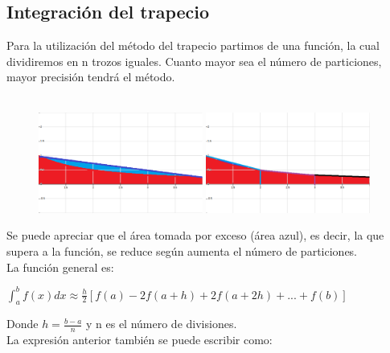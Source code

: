\documentclass{article}
\begin{document}
    \subsection{Integración del trapecio}

      Para la utilización del método del trapecio partimos de una función, la cual dividiremos en n trozos iguales. Cuanto mayor sea el número de particiones, mayor precisión tendrá el método.\\
	\\
	
	\begin{figure}
  	  \begin{center}
         \includegraphics[width=0.48\textwidth]{img2.eps}
	     \includegraphics[width=0.48\textwidth]{img3.eps}
      \end{center}
	\end{figure}

      Se puede apreciar que el área tomada por exceso (área azul), es decir, la que supera a la función, se reduce según aumenta el número de particiones.\\

      La función general es: 
        
      \begin{center}
   
        $\int_{a}^{b}f(x)dx \approx \frac{h}{2}[f(a)-2f(a+h)+2f(a+2h)+...+f(b)]$

      \end{center}
 
      Donde $h=\frac{b-a}{n}$ y n es el número de divisiones.\\

      La expresión anterior también se puede escribir como:
\end{document}
